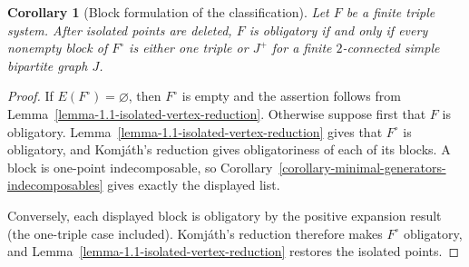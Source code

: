 \documentclass[a4paper,11pt,reqno]{amsart}
\theoremstyle{plain}
\newtheorem{corollary}[theorem]{Corollary}
\theoremstyle{definition}
\theoremstyle{remark}
\begin{document}
\begin{corollary}[Block formulation of the classification]
\label{corollary-block-formulation}
Let $F$ be a finite triple system.  After isolated points are deleted, $F$ is
obligatory if and only if every nonempty block of $F^\circ$ is either one
triple or $J^+$ for a finite $2$-connected simple bipartite graph $J$.
\end{corollary}
\begin{proof}
If $E(F^\circ)=\varnothing$, then $F^\circ$ is empty and the assertion follows
from Lemma~\ref{lemma-1.1-isolated-vertex-reduction}.  Otherwise suppose first
that $F$ is obligatory.  Lemma~\ref{lemma-1.1-isolated-vertex-reduction}
gives that $F^\circ$ is obligatory, and Komj\'ath's reduction gives
obligatoriness of each of its blocks.  A block is one-point indecomposable,
so Corollary~\ref{corollary-minimal-generators-indecomposables} gives exactly
the displayed list.

Conversely, each displayed block is obligatory by the positive expansion
result (the one-triple case included).  Komj\'ath's reduction therefore makes
$F^\circ$ obligatory, and Lemma~\ref{lemma-1.1-isolated-vertex-reduction}
restores the isolated points.
\end{proof}
\end{document}
